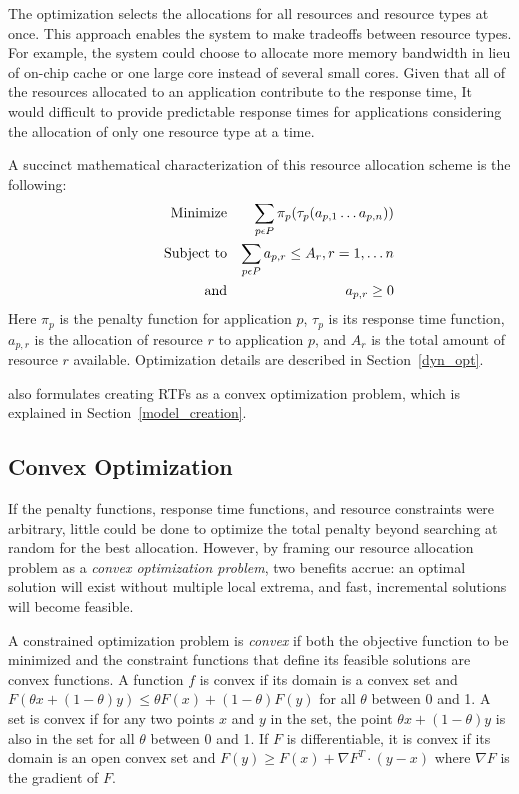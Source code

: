 The optimization selects the allocations for all resources and resource types at once.  This approach enables the system to make tradeoffs between resource types.  For example, the system could choose to allocate more memory bandwidth in lieu of on-chip cache or one large core instead of several small cores.  Given that all of the resources allocated to an application contribute to the response time, It would difficult to provide predictable response times for applications considering the allocation of only one resource type at a time.

A succinct mathematical characterization of this resource allocation scheme is the following:
\begin{eqnarray*}
& \makebox[1in][r]{Minimize}   & \sum_{p\epsilon P} {\pi_p(\tau_p(a_{p,1}\ldots a_{p,n}))}  \\
& \makebox[1in][r]{Subject to} & \sum_{p\epsilon P} a_{p,r} \leq A_r, r = 1,\ldots n        \\
& \makebox[1in][r]{and}        & a_{p,r} \geq 0
\end{eqnarray*}
Here $\pi_p$ is the penalty function for application $p$,
$\tau_p$ is its response time function,
$a_{p,r}$ is the allocation of resource $r$ to application $p$,
and $A_r$ is the total amount of resource $r$ available.  Optimization details are described in Section~\ref{dyn_opt}.

\pacora also formulates creating RTFs as a convex optimization problem, which is explained in Section~\ref{model_creation}.

\subsection*{Convex Optimization}
If the penalty functions, response time functions, and resource constraints were arbitrary,
little could be done to optimize the total penalty beyond searching at random for the best allocation.
However, by framing our resource allocation problem as a \emph{convex optimization problem}\cite{BoVa},
two benefits accrue: an optimal solution will exist without multiple local extrema, and
fast, incremental solutions will become feasible.

A constrained optimization problem is \emph{convex} if both the objective function to be minimized
and the constraint functions that define its feasible solutions are convex functions.
A function $f$ is convex if its domain is a convex set and
$F(\theta x + (1-\theta)y) \leq \theta F(x) + (1-\theta)F(y)$
for all $\theta$ between 0 and 1.
A set is convex if for any two points $x$ and $y$ in the set, the point
$\theta x + (1-\theta)y$
is also in the set for all $\theta$ between 0 and 1.
If $F$ is differentiable, it is convex if its domain is an open convex set and
$F(y) \geq F(x) + \nabla F^T\cdot(y-x)$ where $\nabla F$ is the gradient of $F$.

